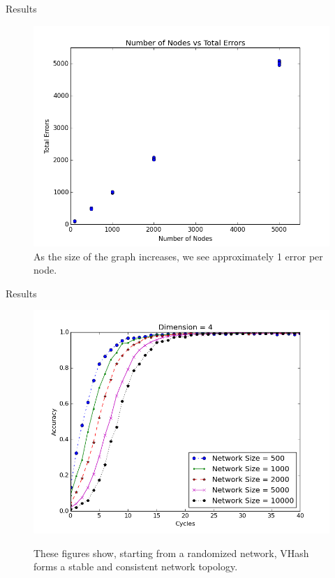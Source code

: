 \documentclass[11pt]{beamer}
\begin{document}
\begin{frame}{Results}
	\begin{figure}
		\centering
		\includegraphics[width=0.75\linewidth]{figs/error_rate}
		\caption{As the size of the graph increases, we see approximately 1 error per node.
		}
		\label{exp_0}
	\end{figure}
\end{frame}


\begin{frame}{Results}
	\begin{figure}
		\label{fig:conv}
		\centering
		\includegraphics[width=0.75\linewidth]{figs/conv_d4}
		\label{conv4}
		
		\caption{These figures show, starting from a randomized network, VHash forms a stable and consistent network topology. %
		}
		
	\end{figure}
\end{frame}
\end{document}
